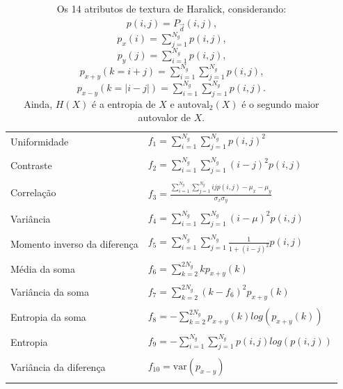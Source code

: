 \begin{table}
  \begin{center}
  \caption{\label{tab:haralick}Os 14 atributos de textura de Haralick,
    considerando: \\ $p(i,j) = P_{\vec{d}}(i,j)$, \\ $p_x(i) = \sum_{j=1}^{N_g}
    p(i,j)$, \\ $p_y(j) = \sum_{i=1}^{N_g} p(i,j)$, \\ $p_{x+y}(k=i+j) =
    \sum_{i=1}^{N_g}\sum_{j=1}^{N_g} p(i,j)$,  \\ $p_{x-y}(k=|i-j|) =
    \sum_{i=1}^{N_g}\sum_{j=1}^{N_g} p(i,j)$. \\ Ainda, $H(X)$ é a entropia de $X$
    e $\text{autoval}_2(X)$ é o segundo maior autovalor de $X$.}

  \begin{tabular}{l|l}
    \hline \hline
    Uniformidade      & $f_1 = \sum_{i=1}^{N_g}\sum_{j=1}^{N_g}
    p(i,j)^2$ \\ \\
    Contraste         & $f_2 = \sum_{i=1}^{N_g}\sum_{j=1}^{N_g} (i-j)^2 p(i,j)$
    \\ \\
    Correlação        & $f_3 = \frac{\sum_{i=1}^{N_g}\sum_{j=1}^{N_g} i j p(i,j)
      - \mu_x - \mu_y}{\sigma_x \sigma_y}$ \\ \\
    Variância         & $f_4 = \sum_{i=1}^{N_g}\sum_{j=1}^{N_g} (i-\mu)^2 p(i,j)$
    \\ \\
    Momento inverso da diferença & $f_5 = \sum_{i=1}^{N_g}\sum_{j=1}^{N_g}
    \frac{1}{1 + (i-j)^2} p(i,j)$ \\ \\
    Média da soma     & $f_6 = \sum_{k=2}^{2 N_g} k p_{x+y}(k)$ \\ \\
    Variância da soma     & $f_7 = \sum_{k=2}^{2 N_g} (k-f_6)^2 p_{x+y}(k)$ \\ \\
    Entropia da soma     & $f_8 = -\sum_{k=2}^{2 N_g} p_{x+y}(k)
    log\left(p_{x+y}(k)\right)$ \\ \\
    Entropia             & $f_9 = -\sum_{i=1}^{N_g}\sum_{j=1}^{N_g} p(i,j)
    log\left(p(i,j)\right)$ \\ \\
    Variância da diferença & $f_{10} = \text{var}(p_{x-y})$ \\ \\

\end{tabular}
\end{center}
\end{table}
